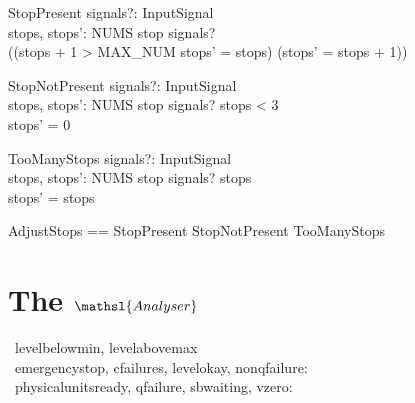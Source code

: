 \documentclass{report} %
\begin{document}
\begin{schema}{StopPresent}
  signals?: \power InputSignal \\ %
  stops, stops': NUMS
  \where %
  stop \in signals?  \\ %
  ((stops + 1 > MAX\_NUM \land stops' = stops) \lor (stops' = stops + 1))
\end{schema}

\begin{schema}{StopNotPresent}
  signals?: \power InputSignal \\ %
  stops, stops': NUMS
  \where %
  stop \notin signals? \land stops < 3 \\ %
  stops' = 0
\end{schema}

\begin{schema}{TooManyStops}
  signals?: \power InputSignal \\ %
  stops, stops': NUMS
  \where %
  stop \notin signals? \land stops  \\ %
  stops' = stops
\end{schema}

\begin{zed}
  AdjustStops == StopPresent \lor StopNotPresent \lor TooManyStops
\end{zed}

\section{The $\mathsl{Analyser}$}

\begin{circus}
  \circchannel\ levelbelowmin, levelabovemax \\
  \circchannel\ emergencystop, cfailures, levelokay, nonqfailure: \boolean \\
  \circchannel\ physicalunitsready, qfailure, sbwaiting, vzero: \boolean
\end{circus}
\end{document}
